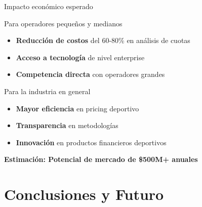\documentclass[aspectratio=169]{beamer}
\begin{document}
\begin{frame}{Impacto económico esperado}
\begin{block}{Para operadores pequeños y medianos}
\begin{itemize}
\item \textcolor{verdepositivo}{\textbf{Reducción de costos}} del 60-80\% en análisis de cuotas
\item \textcolor{azulprincipai}{\textbf{Acceso a tecnología}} de nivel enterprise
\item \textcolor{rojocomplementario}{\textbf{Competencia directa}} con operadores grandes
\end{itemize}
\end{block}

\begin{block}{Para la industria en general}
\begin{itemize}
\item \textcolor{azulprincipai}{\textbf{Mayor eficiencia}} en pricing deportivo
\item \textcolor{verdepositivo}{\textbf{Transparencia}} en metodologías
\item \textcolor{rojocomplementario}{\textbf{Innovación}} en productos financieros deportivos
\end{itemize}
\end{block}

\vspace{0.5cm}
\begin{center}
\textbf{Estimación: Potencial de mercado de \textcolor{azulprincipai}{\$500M+} anuales}
\end{center}
\end{frame}

\section{Conclusiones y Futuro}
\end{document}
